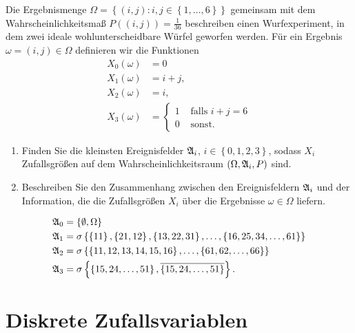  Die Ergebnismenge
$\Omega = \left\{ (i,j) : i,j \in \left\{ 1,\dots ,6 \right\} \right\}$
gemeinsam mit dem Wahrscheinlichkeitsmaß $P( (i,j) ) = \frac{1}{36}$ beschreiben
einen Wurfexperiment, in dem zwei ideale wohlunterscheidbare Würfel geworfen
werden. 
Für ein Ergebnis $\omega = (i,j) \in \Omega$ definieren wir die Funktionen
\begin{align*}
    X_0(\omega) &= 0 \\
    X_1(\omega) &= i+j, \\
    X_2(\omega) &= i, \\
    X_3(\omega) &= 
    \begin{cases}
        1 & \text{ falls } i+j=6 \\
        0 & \text{ sonst.}
    \end{cases}
\end{align*}
\begin{enumerate}
    \item Finden Sie die kleinsten Ereignisfelder $\mathfrak A_{i}$, $i\in \left\{
        0,1,2,3 \right\}$, sodass $X_i$ Zufallsgrößen auf dem Wahrscheinlichkeitsraum
        $(\Omega, \mathfrak A_i, P)$ sind. 
    \item Beschreiben Sie den Zusammenhang zwischen den Ereignisfeldern $\mathfrak A_i$
        und der Information, die die Zufallsgrößen $X_i$ über die Ergebnisse
        $\omega \in \Omega$ liefern.
\end{enumerate}

\solution 
\begin{align*}
    \mathfrak A_0 &= \left\{ \emptyset, \Omega \right\} \\
    \mathfrak A_1 &= \sigma \left\{ \left\{ 11 \right\}, \left\{ 21,12 \right\}, \left\{ 13,22,31
    \right\},\dots , \left\{ 16,25,34,\dots ,61 \right\} \right\} \\
    \mathfrak A_2 &= \sigma \left\{ \left\{ 11,12,13,14,15,16 \right\},\dots ,\left\{ 61,62,\dots ,66
    \right\} \right\} \\
    \mathfrak A_3 &= \sigma \left\{ \left\{ 15,24,\dots ,51 \right\}, 
    \overline{ \left\{ 15,24,\dots ,51 \right\}  } \right\}.
\end{align*}


\section{Diskrete Zufallsvariablen}

